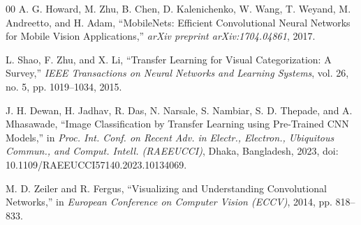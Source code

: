 \documentclass[conference]{IEEEtran}
\begin{document}
\begin{thebibliography}{00}
A. G. Howard, M. Zhu, B. Chen, D. Kalenichenko, W. Wang, T. Weyand, M. Andreetto, and H. Adam, ``MobileNets: Efficient Convolutional Neural Networks for Mobile Vision Applications,'' \textit{arXiv preprint arXiv:1704.04861}, 2017.

L. Shao, F. Zhu, and X. Li, ``Transfer Learning for Visual Categorization: A Survey,'' \textit{IEEE Transactions on Neural Networks and Learning Systems}, vol. 26, no. 5, pp. 1019--1034, 2015.

J. H. Dewan, H. Jadhav, R. Das, N. Narsale, S. Nambiar, S. D. Thepade, and A. Mhasawade, ``Image Classification by Transfer Learning using Pre-Trained CNN Models,'' in \textit{Proc. Int. Conf. on Recent Adv. in Electr., Electron., Ubiquitous Commun., and Comput. Intell. (RAEEUCCI)}, Dhaka, Bangladesh, 2023, doi: 10.1109/RAEEUCCI57140.2023.10134069.

M. D. Zeiler and R. Fergus, ``Visualizing and Understanding Convolutional Networks,'' in \textit{European Conference on Computer Vision (ECCV)}, 2014, pp. 818--833.

\end{thebibliography}
\end{document}
